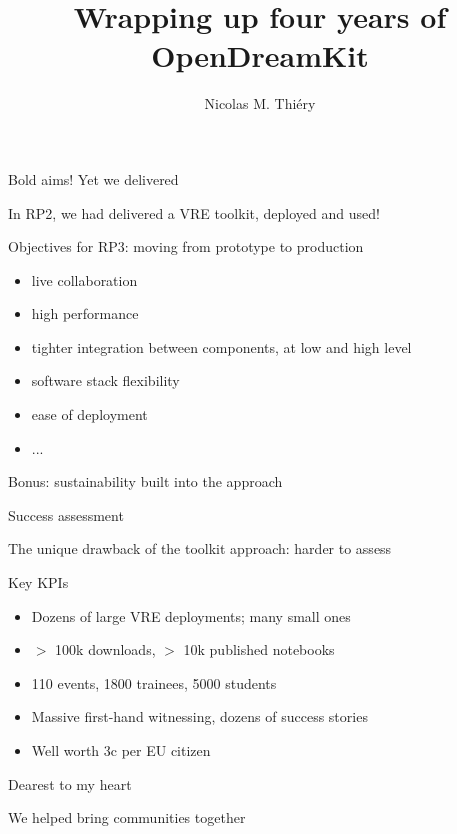 \documentclass[svgnames]{beamer}
\author{Nicolas M. Thiéry}
\title{Wrapping up four years of OpenDreamKit}
\newcommand{\greencheckmark}{\scalebox{1.5}{\color{DarkGreen}\checkmark}}
\begin{document}
\begin{frame}
  \titlepage
\end{frame}

\begin{frame}{Bold aims! Yet we delivered}

  In RP2, we had delivered a VRE toolkit\pause, deployed and used!
  \bigskip\pause

  \begin{block}{Objectives for RP3: moving from prototype to production}
    \begin{itemize}
    \item \greencheckmark live collaboration
    \item \greencheckmark high performance
    \item \greencheckmark tighter integration between components, at low and high level
    \item \greencheckmark software stack flexibility
    \item \greencheckmark ease of deployment
    \item \greencheckmark  ...
    \end{itemize}
  \end{block}
  \bigskip\pause

  \begin{block}{Bonus: sustainability built into the approach}
  \end{block}
\end{frame}


\begin{frame}{Success assessment}

  The unique drawback of the toolkit approach: harder to assess\bigskip
  \pause
  \begin{block}{Key KPIs}
    \begin{itemize}
    \item Dozens of large VRE deployments; many small ones
    \item $>$ 100k downloads, $>$ 10k published notebooks
    \item 110 events, 1800 trainees, 5000 students
    \item Massive first-hand witnessing, dozens of success stories
      \pause
    \item Well worth 3c per EU citizen
    \end{itemize}
  \end{block}
  \pause

  \begin{block}{Dearest to my heart}
    \bigskip
    \centerline{We helped bring communities together}
  \end{block}
\end{frame}
\end{document}
